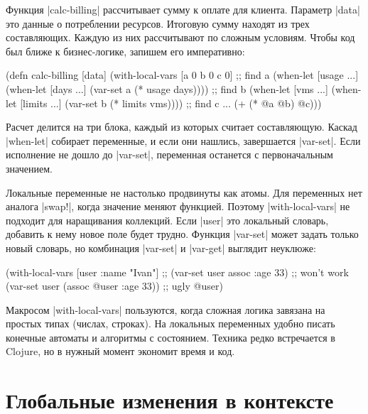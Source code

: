 Функция \spverb|calc-billing| рассчитывает сумму к оплате для клиента. Параметр
\spverb|data| это данные о потреблении ресурсов. Итоговую сумму находят из трех
составляющих. Каждую из них рассчитывают по сложным условиям. Чтобы код был
ближе к бизнес-логике, запишем его императивно:

\begin{english}
  \begin{clojure}
(defn calc-billing [data]
  (with-local-vars
    [a 0 b 0 c 0]
    ;; find a
    (when-let [usage ...]
      (when-let [days ...]
        (var-set a (* usage days))))
    ;; find b
    (when-let [vms ...]
      (when-let [limits ...]
        (var-set b (* limits vms))))
    ;; find c ...
    (+ (* @a @b) @c)))
  \end{clojure}
\end{english}

Расчет делится на три блока, каждый из которых считает составляющую. Каскад
\spverb|when-let| собирает переменные, и если они нашлись, завершается
\spverb|var-set|. Если исполнение не дошло до \spverb|var-set|, переменная
останется с первоначальным значением.

Локальные переменные не настолько продвинуты как атомы. Для переменных нет
аналога \spverb|swap!|, когда значение меняют функцией. Поэтому
\spverb|with-local-vars| не подходит для наращивания коллекций. Если
\spverb|user| это локальный словарь, добавить к нему новое поле будет
трудно. Функция \spverb|var-set| может задать только новый словарь, но
комбинация \spverb|var-set| и \spverb|var-get| выглядит неуклюже:

\begin{english}
  \begin{clojure}
(with-local-vars [user {:name "Ivan"}]
  ;; (var-set user assoc :age 33) ;; won't work
  (var-set user (assoc @user :age 33)) ;; ugly
  @user)
  \end{clojure}
\end{english}

Макросом \spverb|with-local-vars| пользуются, когда сложная логика завязана на
простых типах (числах, строках). На локальных переменных удобно писать конечные
автоматы и алгоритмы с состоянием. Техника редко встречается в Clojure, но в
нужный момент экономит время и код.

\section{Глобальные изменения в контексте}

